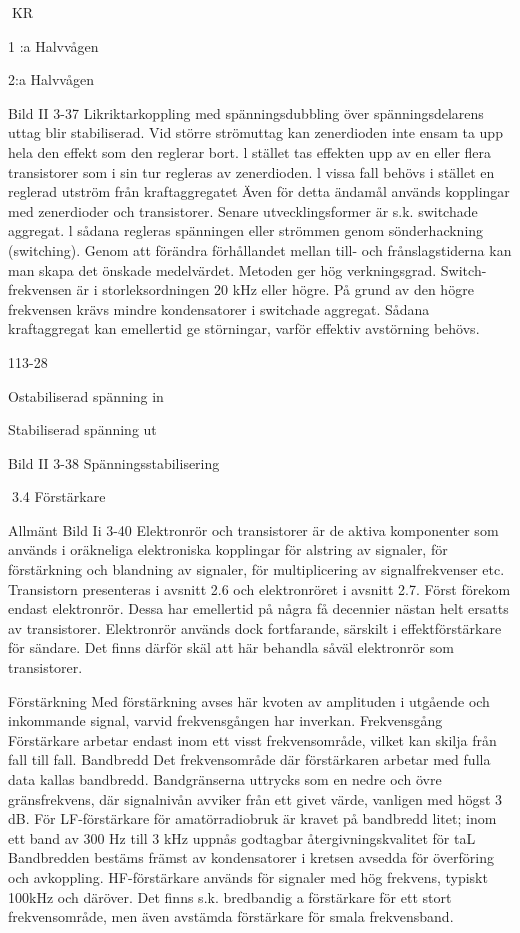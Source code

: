 {{{KR

1 :a Halvvågen

2:a Halvvågen

Bild II 3-37 Likriktarkoppling med spänningsdubbling
över spänningsdelarens uttag blir stabiliserad. Vid större strömuttag kan zenerdioden
inte ensam ta upp hela den effekt som den
reglerar bort. l stället tas effekten upp av en
eller flera transistorer som i sin tur regleras
av zenerdioden.
l vissa fall behövs i stället en reglerad
utström från kraftaggregatet Även för detta
ändamål används kopplingar med zenerdioder och transistorer.
Senare utvecklingsformer är s.k. switchade aggregat. l sådana regleras spänningen eller strömmen genom sönderhackning (switching). Genom att förändra förhållandet mellan till- och frånslagstiderna kan
man skapa det önskade medelvärdet. Metoden ger hög verkningsgrad. Switch-frekvensen är i storleksordningen 20 kHz eller högre. På grund av den högre frekvensen
krävs mindre kondensatorer i switchade
aggregat. Sådana kraftaggregat kan emellertid ge störningar, varför effektiv avstörning behövs.

113-28

Ostabiliserad
spänning in

Stabiliserad
spänning ut

Bild II 3-38 Spänningsstabilisering

3.4 Förstärkare

Allmänt
Bild Ii 3-40
Elektronrör och transistorer är de aktiva komponenter som används i oräkneliga elektroniska kopplingar för alstring av signaler, för
förstärkning och blandning av signaler, för
multiplicering av signalfrekvenser etc.
Transistorn presenteras i avsnitt 2.6 och
elektronröret i avsnitt 2.7.
Först förekom endast elektronrör. Dessa
har emellertid på några få decennier nästan
helt ersatts av transistorer. Elektronrör används dock fortfarande, särskilt i effektförstärkare för sändare. Det finns därför skäl att
här behandla såväl elektronrör som transistorer.

Förstärkning
Med förstärkning avses här kvoten av amplituden i utgående och inkommande signal,
varvid frekvensgången har inverkan.
Frekvensgång
Förstärkare arbetar endast inom ett visst
frekvensområde, vilket kan skilja från fall till
fall.
Bandbredd
Det frekvensområde där förstärkaren arbetar med fulla data kallas bandbredd. Bandgränserna uttrycks som en nedre och övre
gränsfrekvens, där signalnivån avviker från
ett givet värde, vanligen med högst 3 dB.
För LF-förstärkare för amatörradiobruk
är kravet på bandbredd litet; inom ett band
av 300 Hz till 3 kHz uppnås godtagbar
återgivningskvalitet för taL Bandbredden
bestäms främst av kondensatorer i kretsen
avsedda för överföring och avkoppling.
HF-förstärkare används för signaler med
hög frekvens, typiskt 100kHz och däröver.
Det finns s.k. bredbandig a förstärkare för ett
stort frekvensområde, men även avstämda
förstärkare för smala frekvensband.

}}}
